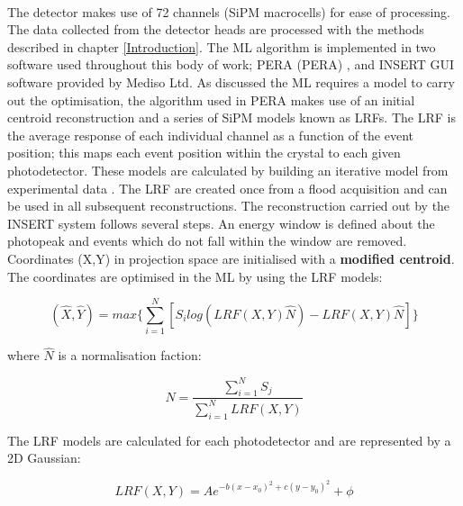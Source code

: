 \paragraph{}
The detector makes use of 72 channels (\acrshort{SiPM} macrocells) for ease of processing. The data collected from the detector heads are processed with the methods described in chapter \ref{Introduction}. The \acrshort{ML} algorithm is implemented in two software used throughout this body of work; \acrshort{PERA} (\acrlong{PERA}) \cite{OCCHIPINTI2015DevelopmentImaging}, and INSERT GUI software provided by Mediso Ltd. As discussed the \acrshort{ML} requires a model to carry out the optimisation, the algorithm used in \acrshort{PERA} makes use of an initial centroid reconstruction and a series of \acrshort{SiPM} models known as \acrlong{LRF}s. The \acrshort{LRF} is the average response of each individual channel as a function of the event position; this maps each event position within the crystal to each given photodetector. These models are calculated by building an iterative model from experimental data \cite{Morozov_2017} \cite{8069405}. The \acrshort{LRF} are created once from a flood acquisition and can be used in all subsequent reconstructions. The reconstruction carried out by the \acrshort{INSERT} system follows several steps. An energy window is defined about the photopeak and events which do not fall within the window are removed. Coordinates (X,Y) in projection space are initialised with a \textbf{modified centroid}. The coordinates are optimised in the \acrshort{ML} by using the \acrshort{LRF} models: 

\begin{equation} \label{eqn:PERA}
                (\hat{X},\hat{Y}) = max\{ \sum^{N}_{i=1} [ S_{i}log(LRF(X,Y) \hat{N}) - LRF(X,Y) \hat{N} ] \}
\end{equation}

where $\hat{N}$ is a normalisation faction:

\begin{equation} \label{eqn:Norm}
                \hat{N} = \frac{\sum^{N}_{i=1} S_{j}}{\sum^{N}_{i=1} LRF(X,Y)}
\end{equation}

The \acrshort{LRF} models are calculated for each photodetector and are represented by a 2D Gaussian: 

\begin{equation} \label{eqn:LRF}
    LRF(X,Y) = Ae^{-b(x-x_{0})^{2} + c(y-y_{0})^2} + \phi
\end{equation}


